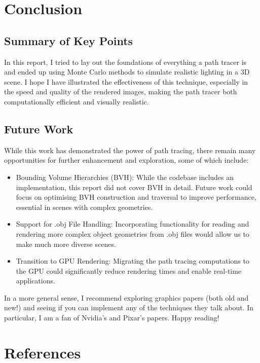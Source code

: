 \documentclass[12pt]{article}
\begin{document}
\section{Conclusion}
\label{sec:conclusion}
\subsection{Summary of Key Points}
In this report, I tried to lay out the foundations of everything a path tracer is and ended up using Monte Carlo methods to simulate realistic lighting in a 3D scene. I hope I have illustrated the effectiveness of this technique, especially in the speed and quality of the rendered images, making the path tracer both computationally efficient and visually realistic.

\subsection{Future Work}

While this work has demonstrated the power of path tracing, there remain many opportunities for further enhancement and exploration, some of which include:
\begin{itemize}
    \item Bounding Volume Hierarchies (BVH): While the codebase includes an implementation, this report did not cover BVH in detail. Future work could focus on optimising BVH construction and traversal to improve performance, essential in scenes with complex geometries.

    \item Support for .obj File Handling: Incorporating functionality for reading and rendering more complex object geometries from .obj files would allow us to make much more diverse scenes.

    \item Transition to GPU Rendering: Migrating the path tracing computations to the GPU could significantly reduce rendering times and enable real-time applications.
\end{itemize}

In a more general sense, I recommend exploring graphics papers (both old and new!) and seeing if you can implement any of the techniques they talk about. In particular, I am a fan of Nvidia's and Pixar's papers. Happy reading!

\section{References}
\label{sec:references}


\end{document}
